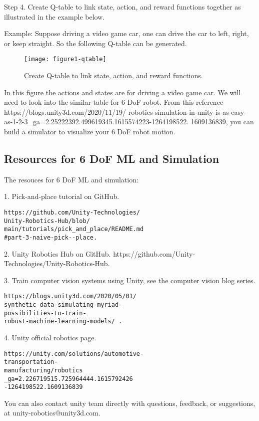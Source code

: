 \documentclass[conference]{IEEEtran}
\begin{document}
Step 4. Create Q-table to link state, action, and reward functions 
together as illustrated in the example below. 

Example: Suppose driving a video game car, one 
can drive the car to left, right, or keep straight. So 
the following Q-table can be generated. 
\begin{figure}[H] 
\centering
\texttt{[image: figure1-qtable]}  
\caption{Create Q-table to link state, action, 
and reward functions.}
\label{fig1-qtable} 
\end{figure}
In this figure the actions and states are for 
driving a video game car. We will need to look into the 
similar table for 6 DoF robot. 
From this reference
https://blogs.unity3d.com/2020/11/19/
robotics-simulation-in-unity-is-as-easy-
as-1-2-3\_ga=2.25222392.499619345.1615574223-1264198522.
1609136839, you can build a simulator to visualize 
your 6 DoF robot motion. 

\subsection{Resources for 6 DoF ML and Simulation}
The resouces for 6 DoF ML and simulation: 

1. Pick-and-place tutorial on GitHub.
\begin{verbatim}
https://github.com/Unity-Technologies/
Unity-Robotics-Hub/blob/
main/tutorials/pick_and_place/README.md
#part-3-naive-pick--place. 
\end{verbatim}

2. Unity Robotics Hub on GitHub. 
https://github.com/Unity-Technologies/Unity-Robotics-Hub. 

3. Train computer vision systems using Unity, see 
the computer vision blog series. 
\begin{verbatim}
https://blogs.unity3d.com/2020/05/01/
synthetic-data-simulating-myriad-
possibilities-to-train-
robust-machine-learning-models/ .
\end{verbatim}

4. Unity official robotics page. 
\begin{verbatim}
https://unity.com/solutions/automotive-
transportation-
manufacturing/robotics
_ga=2.226719515.725964444.1615792426
-1264198522.1609136839 
\end{verbatim}
You can also contact unity team directly with questions, 
feedback, or suggestions, at unity-robotics@unity3d.com. 
\end{document}
